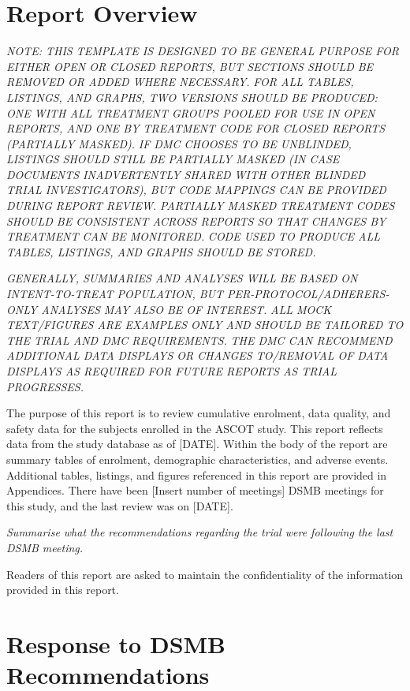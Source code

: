 \documentclass[
  11pt,
]{article}
\begin{document}
\clearpage

\hypertarget{report-overview}{%
\section{Report Overview}\label{report-overview}}

\emph{NOTE: THIS TEMPLATE IS DESIGNED TO BE GENERAL PURPOSE FOR EITHER OPEN OR CLOSED REPORTS, BUT SECTIONS SHOULD BE REMOVED OR ADDED WHERE NECESSARY.}
\emph{FOR ALL TABLES, LISTINGS, AND GRAPHS, TWO VERSIONS SHOULD BE PRODUCED: ONE WITH ALL TREATMENT GROUPS POOLED FOR USE IN OPEN REPORTS, AND ONE BY TREATMENT CODE FOR CLOSED REPORTS (PARTIALLY MASKED).}
\emph{IF DMC CHOOSES TO BE UNBLINDED, LISTINGS SHOULD STILL BE PARTIALLY MASKED (IN CASE DOCUMENTS INADVERTENTLY SHARED WITH OTHER BLINDED TRIAL INVESTIGATORS), BUT CODE MAPPINGS CAN BE PROVIDED DURING REPORT REVIEW.}
\emph{PARTIALLY MASKED TREATMENT CODES SHOULD BE CONSISTENT ACROSS REPORTS SO THAT CHANGES BY TREATMENT CAN BE MONITORED.}
\emph{CODE USED TO PRODUCE ALL TABLES, LISTINGS, AND GRAPHS SHOULD BE STORED.}

\emph{GENERALLY, SUMMARIES AND ANALYSES WILL BE BASED ON INTENT-TO-TREAT POPULATION, BUT PER-PROTOCOL/ADHERERS-ONLY ANALYSES MAY ALSO BE OF INTEREST.}
\emph{ALL MOCK TEXT/FIGURES ARE EXAMPLES ONLY AND SHOULD BE TAILORED TO THE TRIAL AND DMC REQUIREMENTS.}
\emph{THE DMC CAN RECOMMEND ADDITIONAL DATA DISPLAYS OR CHANGES TO/REMOVAL OF DATA DISPLAYS AS REQUIRED FOR FUTURE REPORTS AS TRIAL PROGRESSES.}

The purpose of this report is to review cumulative enrolment, data quality, and safety data for the subjects enrolled in the ASCOT study.
This report reflects data from the study database as of {[}DATE{]}.
Within the body of the report are summary tables of enrolment, demographic characteristics, and adverse events.
Additional tables, listings, and figures referenced in this report are provided in Appendices.
There have been {[}Insert number of meetings{]} DSMB meetings for this study, and the last review was on {[}DATE{]}.

\emph{Summarise what the recommendations regarding the trial were following the last DSMB meeting.}

Readers of this report are asked to maintain the confidentiality of the information provided in this report.

\clearpage

\hypertarget{response-to-dsmb-recommendations}{%
\section{Response to DSMB Recommendations}\label{response-to-dsmb-recommendations}}
\end{document}
